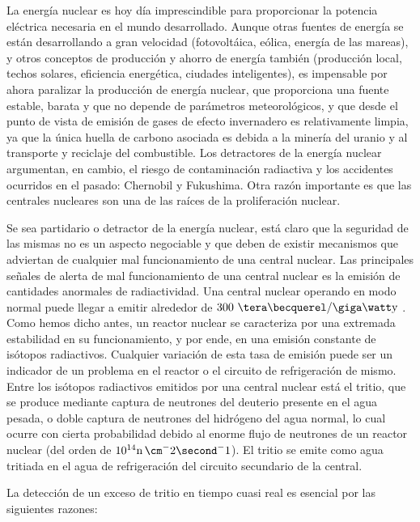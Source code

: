 La energía nuclear es hoy día imprescindible para proporcionar la potencia eléctrica necesaria en el mundo desarrollado.  Aunque  otras fuentes de energía se están desarrollando a gran velocidad (fotovoltáica, eólica, energía de las mareas), y otros conceptos de producción y ahorro de energía también (producción local, techos solares, eficiencia energética, ciudades inteligentes), es impensable por ahora paralizar la producción de energía nuclear, que proporciona una fuente estable, barata y que no depende de parámetros meteorológicos, y que desde el  punto de vista de emisión de gases de efecto invernadero es relativamente limpia, ya que la única huella de carbono asociada es debida a la minería del uranio y al transporte y reciclaje del combustible.
Los detractores de la energía nuclear argumentan, en cambio, el riesgo de contaminación radiactiva y los accidentes ocurridos en el pasado: Chernobil y Fukushima. Otra razón importante es que las centrales nucleares son una de las raíces de la proliferación nuclear.

Se sea partidario o detractor de la energía nuclear, está claro que la seguridad de las mismas no es un aspecto  negociable y que deben de existir mecanismos que adviertan de cualquier mal funcionamiento de una central nuclear.  Las principales señales de alerta de mal funcionamiento de una central nuclear es la emisión de cantidades anormales de radiactividad. Una central nuclear operando en modo normal puede llegar a emitir alrededor de $300\ \tera\becquerel/\giga\watt\mathrm{y}$ \cite{300TBq}. Como hemos dicho antes, un reactor nuclear se caracteriza por una extremada estabilidad en su funcionamiento, y por ende, en una emisión constante  de isótopos radiactivos.  Cualquier variación de esta tasa de emisión puede ser un indicador de un problema en el reactor o el circuito de refrigeración de mismo. Entre los isótopos radiactivos emitidos por una central  nuclear está el tritio, que se produce mediante captura de neutrones del deuterio presente en el  agua pesada, o doble captura de neutrones del hidrógeno del agua normal, lo cual ocurre con cierta probabilidad debido al enorme flujo de neutrones de un reactor nuclear (del orden de $10^{14} \ce{n} \, \cm^-2\second^-1$).  El tritio se emite como agua tritiada en el agua de refrigeración del circuito secundario  de la central.  

La detección de un exceso de tritio en tiempo cuasi real es esencial por las siguientes razones:

